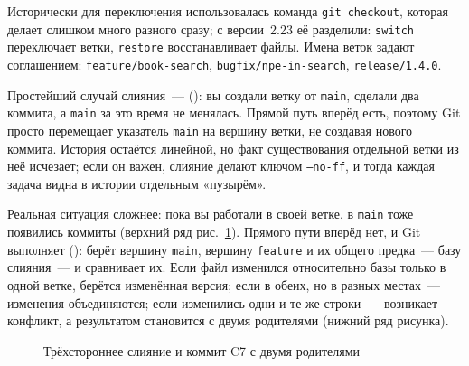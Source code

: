 Исторически для переключения использовалась команда \texttt{git checkout}, которая делает слишком много разного сразу; с версии~2.23 её разделили: \texttt{switch} переключает ветки, \texttt{restore} восстанавливает файлы. Имена веток задают соглашением: \texttt{feature/book-search}, \texttt{bugfix/npe-in-search}, \texttt{release/1.4.0}.

Простейший случай слияния~---  (): вы создали ветку от \texttt{main}, сделали два коммита, а \texttt{main} за это время не менялась. Прямой путь вперёд есть, поэтому Git просто перемещает указатель \texttt{main} на вершину ветки, не создавая нового коммита. История остаётся линейной, но факт существования отдельной ветки из неё исчезает; если он важен, слияние делают ключом \texttt{--no-ff}, и тогда каждая задача видна в истории отдельным «пузырём».

Реальная ситуация сложнее: пока вы работали в своей ветке, в \texttt{main} тоже появились коммиты (верхний ряд рис.~\ref{fig:12-3}). Прямого пути вперёд нет, и Git выполняет  (): берёт вершину \texttt{main}, вершину \texttt{feature} и их общего предка~--- базу слияния~--- и сравнивает их. Если файл изменился относительно базы только в одной ветке, берётся изменённая версия; если в обеих, но в разных местах~--- изменения объединяются; если изменились одни и те же строки~--- возникает конфликт, а результатом становится  с двумя родителями (нижний ряд рисунка).

\begin{figure}[htbp]\centering
{}
\caption{Трёхстороннее слияние и коммит C7 с двумя родителями}\label{fig:12-3}
\end{figure}

